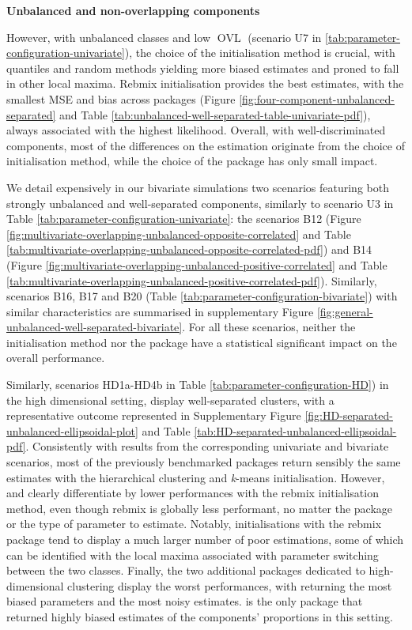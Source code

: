 \textbf{Unbalanced and non-overlapping components}

However, with unbalanced classes and low \(\operatorname{OVL}\) (scenario U7 in
\ref{tab:parameter-configuration-univariate}), the choice of the
initialisation method is crucial, with quantiles and random
methods yielding more biased estimates and proned to fall in other local
maxima. Rebmix initialisation provides the best estimates, with the
smallest MSE and bias across packages (Figure
\ref{fig:four-component-unbalanced-separated} and Table
\ref{tab:unbalanced-well-separated-table-univariate-pdf}),
always associated with the highest likelihood. Overall, with
well-discriminated components, most of the differences on the estimation
originate from the choice of initialisation method, while the choice of
the package has only small impact.

We detail expensively in our bivariate simulations two scenarios featuring both strongly unbalanced and well-separated components, similarly to scenario U3 in Table \ref{tab:parameter-configuration-univariate}: the scenarios B12 (Figure \ref{fig:multivariate-overlapping-unbalanced-opposite-correlated} and Table \ref{tab:multivariate-overlapping-unbalanced-opposite-correlated-pdf}) and B14 (Figure \ref{fig:multivariate-overlapping-unbalanced-positive-correlated} and Table \ref{tab:multivariate-overlapping-unbalanced-positive-correlated-pdf}). Similarly, scenarios B16, B17 and B20 (Table \ref{tab:parameter-configuration-bivariate}) with similar characteristics are summarised in supplementary Figure \ref{fig:general-unbalanced-well-separated-bivariate}. For all these scenarios, neither the initialisation method nor the package have a statistical significant impact on the overall performance.

\color{blue}

Similarly, scenarios HD1a-HD4b in Table \ref{tab:parameter-configuration-HD}) in the high dimensional setting, display well-separated clusters, with a representative outcome represented in Supplementary Figure \ref{fig:HD-separated-unbalanced-ellipsoidal-plot} and Table \ref{tab:HD-separated-unbalanced-ellipsoidal-pdf}. Consistently with results from the corresponding univariate and bivariate scenarios, most of the previously benchmarked packages return sensibly the same estimates with the hierarchical clustering and \emph{k}-means initialisation. However,  and  clearly differentiate by lower performances with the rebmix initialisation method, even though rebmix is globally less performant, no matter the package or the type of parameter to estimate. Notably, initialisations with the rebmix package tend to display a much larger number of poor estimations, some of which can be identified with the local maxima associated with parameter switching between the two classes. Finally, the two additional packages dedicated to high-dimensional clustering display the worst performances, with  returning the most biased parameters and  the most noisy estimates.  is the only package that returned highly biased estimates of the components' proportions in this setting.
\color{black}

